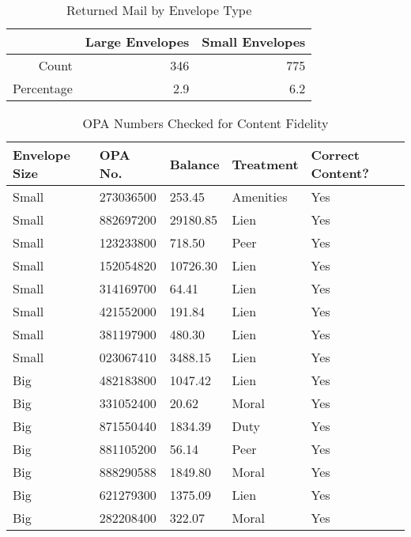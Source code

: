 
\begin{table}[ht]
\centering
\begin{tabular}{rrr}
  \hline
 & Large Envelopes & Small Envelopes \\ 
  \hline
Count & 346 & 775 \\ 
  Percentage & 2.9 & 6.2 \\ 
   \hline
\end{tabular}
\caption{Returned Mail by Envelope Type} 
\label{table_return_env}
\end{table}


\begin{table}[ht]
\centering
\begin{tabular}{lllll}
  \hline
Envelope Size & OPA No. & Balance & Treatment & Correct Content? \\ 
  \hline
Small & 273036500 &  253.45 & Amenities & Yes \\ 
  Small & 882697200 & 29180.85 & Lien & Yes \\ 
  Small & 123233800 &  718.50 & Peer & Yes \\ 
  Small & 152054820 & 10726.30 & Lien & Yes \\ 
  Small & 314169700 &   64.41 & Lien & Yes \\ 
  Small & 421552000 &  191.84 & Lien & Yes \\ 
  Small & 381197900 &  480.30 & Lien & Yes \\ 
  Small & 023067410 & 3488.15 & Lien & Yes \\ 
  Big & 482183800 & 1047.42 & Lien & Yes \\ 
  Big & 331052400 &   20.62 & Moral & Yes \\ 
  Big & 871550440 & 1834.39 & Duty & Yes \\ 
  Big & 881105200 &   56.14 & Peer & Yes \\ 
  Big & 888290588 & 1849.80 & Moral & Yes \\ 
  Big & 621279300 & 1375.09 & Lien & Yes \\ 
  Big & 282208400 &  322.07 & Moral & Yes \\ 
   \hline
\end{tabular}
\caption{OPA Numbers Checked for Content Fidelity} 
\label{table_content_fidelity}
\end{table}